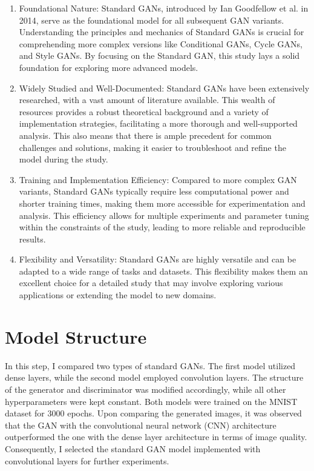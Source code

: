 \begin{enumerate}
    \item Foundational Nature: Standard GANs, introduced by Ian Goodfellow et al. in 2014, serve as the 
    foundational model for all subsequent GAN variants. Understanding the principles and mechanics of 
    Standard GANs is crucial for comprehending more complex versions like Conditional GANs, Cycle GANs, 
    and Style GANs. By focusing on the Standard GAN, this study lays a solid foundation for exploring more advanced models.

    \item Widely Studied and Well-Documented: Standard GANs have been extensively researched, with a 
    vast amount of literature available. This wealth of resources provides a robust theoretical 
    background and a variety of implementation strategies, facilitating a more thorough and 
    well-supported analysis. This also means that there is ample precedent for common challenges 
    and solutions, making it easier to troubleshoot and refine the model during the study.

    \item Training and Implementation Efficiency: Compared to more complex GAN variants, 
    Standard GANs typically require less computational power and shorter training times, 
    making them more accessible for experimentation and analysis. This efficiency allows 
    for multiple experiments and parameter tuning within the constraints of the study, 
    leading to more reliable and reproducible results.

    \item Flexibility and Versatility: Standard GANs are highly versatile and can be adapted 
    to a wide range of tasks and datasets. This flexibility makes them an excellent choice for 
    a detailed study that may involve exploring various applications or extending the model to new domains.
\end{enumerate}



\section{Model Structure}

In this step, I compared two types of standard GANs. The first model utilized dense layers, while the 
second model employed convolution layers. The structure of the generator and discriminator was modified 
accordingly, while all other hyperparameters were kept constant. Both models were trained on the MNIST 
dataset for 3000 epochs. Upon comparing the generated images, it was observed that the GAN with the convolutional 
neural network (CNN) architecture outperformed the one with the dense layer architecture in terms of image quality. 
Consequently, I selected the standard GAN model implemented with convolutional layers for further experiments.

